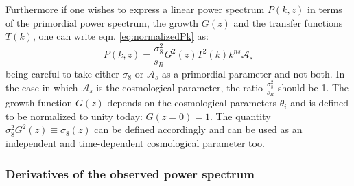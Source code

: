 Furthermore if one wishes to express a linear power spectrum $P(k,z)$
in terms of the primordial power spectrum, the growth $G(z)$ and
the transfer functions $T(k)$, one can write eqn. \ref{eq:normalizedPk}
as: 
\begin{equation}
P(k,z)=\frac{\sigma_{8}^{2}}{s_{R}}G^{2}(z)T^{2}(k)k^{ns}\mathcal{A}_{s}
\end{equation}
being careful to take either $\sigma_{8}$ or $\mathcal{A}_{s}$ as
a primordial parameter and not both. In the case in which $\mathcal{A}_{s}$
is the cosmological parameter, the ratio $\frac{\sigma_{8}^{2}}{s_{R}}$
should be 1. The growth function $G(z)$ depends on the cosmological
parameters $\theta_{i}$ and is defined to be normalized to unity
today: $G(z=0)=1$. The quantity $\sigma_{8}^{2}G^{2}(z)\equiv\sigma_{8}(z)$
can be defined accordingly and can be used as an independent and time-dependent
cosmological parameter too. 


\subsubsection{Derivatives of the observed power spectrum}

